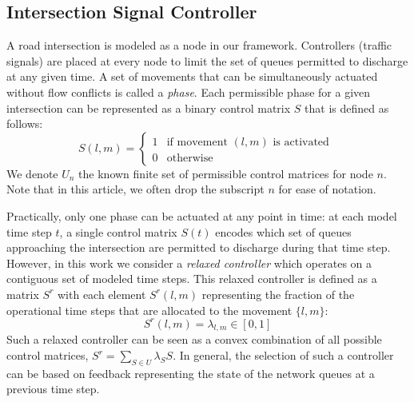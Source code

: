 \subsection*{Intersection Signal Controller}
A road intersection is modeled as a node in our framework. Controllers (traffic signals) are placed at every node to limit the set of queues permitted to discharge at any given time. A set of movements that can be simultaneously actuated without flow conflicts is called a \emph{phase}.  Each permissible phase for a given intersection can be represented as a binary control matrix $S$ that is defined as follows: 
\begin{equation}
S(l,m) = \begin{cases}
        1 & \text{if movement $(l,m)$ is activated }  \\
        0 & \mbox{otherwise}
    \end{cases}
\end{equation}
We denote $U_n$ the known finite set of permissible control matrices for node $n$. Note that in this article, we often drop the subscript $n$ for ease of notation. 

Practically, only one phase can be actuated at any point in time: at each model time step $t$, a single control matrix $S(t)$ encodes which set of queues approaching the intersection are permitted to discharge during that time step. However, in this work we consider a \emph{relaxed controller} which operates on a contiguous set of modeled time steps. This relaxed controller is defined as a matrix $S^r$ with each element $S^r(l,m)$ representing the fraction of the operational time steps that are allocated to the movement $\{l,m\}$:
\begin{equation}\label{relaxed1}
S^r(l,m) = \lambda_{l,m} \in [0,1]
\end{equation}
Such a relaxed controller can be seen as a convex combination of all possible control matrices, $
S^r = \sum_{S\in U}\lambda_{S}S$. 
In general, the selection of such a controller can be based on feedback representing the state of the network queues at a previous time step.

\vspace{-.5em}
